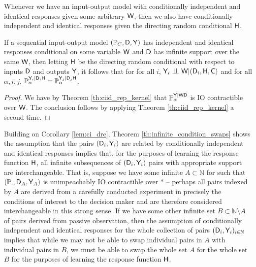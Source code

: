 Whenever we have an input-output model with conditionally independent and identical responses given some arbitrary $\mathsf{W}$, then we also have conditionally independent and identical responses given the directing random conditional $\mathsf{H}$.

\begin{corollary}\label{lem:ci_drc}
If a sequential input-output model $(\mathbb{P}_C,\mathsf{D},\mathsf{Y})$ has independent and identical responses conditional on some variable $\mathsf{W}$ and $\mathsf{D}$ has infinite support over the same $\mathsf{W}$, then letting $\mathsf{H}$ be the directing random conditional with respect to inputs $\mathsf{D}$ and outputs $\mathsf{Y}$, it follows that for for all $i$, $\RV{Y}_i\CI \RV{W}|(\RV{D}_i,\RV{H},\RV{C})$ and for all $\alpha, i, j$, $\mathbb{P}_\alpha^{\mathsf{Y}_i|\mathsf{D}_i\mathsf{H}}=\mathbb{P}_\alpha^{\mathsf{Y}_j|\mathsf{D}_j\mathsf{H}}$.
\end{corollary}

\begin{proof}
We have by Theorem \ref{th:ciid_rep_kernel} that $\mathbb{P}_\alpha^{\mathsf{Y}|\mathsf{W}\mathsf{D}}$ is IO contractible over $\mathsf{W}$. The conclusion follows by applying Theorem \ref{th:ciid_rep_kernel} a second time.
\end{proof}

Building on Corollary \ref{lem:ci_drc}, Theorem \ref{th:infinite_condition_swaps} shows the assumption that the pairs $(\mathsf{D}_i,\mathsf{Y}_i)$ are related by conditionally independent and identical responses implies that, for the purposes of learning the response function $\mathsf{H}$, all infinite subsequences of $(\mathsf{D}_i,\mathsf{Y}_i)$ pairs with appropriate support are interchangeable. That is, suppose we have some infinite $A\subset \mathbb{N}$ for such that $(\mathbb{P}_\cdot,\mathsf{D}_A,\mathsf{Y}_A)$ is unimpeachably IO contractible over $*$ -- perhaps all pairs indexed by $A$ are derived from a carefully conducted experiment in precisely the conditions of interest to the decision maker and are therefore considered interchangeable in this strong sense. If we have some other infinite set $B\subset \mathbb{N}\setminus A$ of pairs derived from passive observation, then the assumption of conditionally independent and identical responses for the whole collection of pairs $(\mathsf{D}_i,\mathsf{Y}_i)_{i\in\mathbb{N}}$ implies that while we may not be able to swap individual pairs in $A$ with individual pairs in $B$, we must be able to swap the whole set $A$ for the whole set $B$ for the purposes of learning the response function $\mathsf{H}$.


